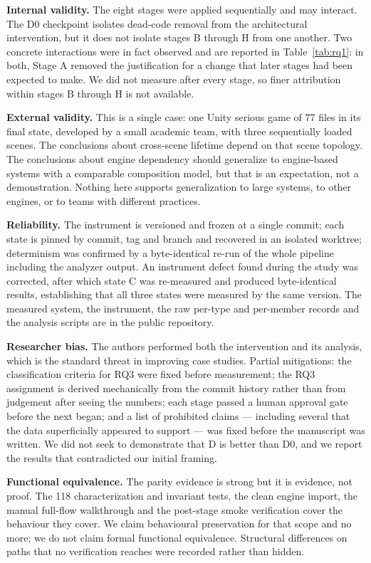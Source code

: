 \documentclass{sbc2019}%
\begin{document}
\medskip\noindent\textbf{Internal validity.} The eight stages were applied
sequentially and may interact. The D0 checkpoint isolates dead-code removal from
the architectural intervention, but it does not isolate stages B through H from
one another. Two concrete interactions were in fact observed and are reported in
Table~\ref{tab:rq1}: in both, Stage A removed the justification for a change
that later stages had been expected to make. We did not measure after every
stage, so finer attribution within stages B through H is not available.

\medskip\noindent\textbf{External validity.} This is a single case: one
Unity serious game of 77 files in its final state, developed by a small academic
team, with three sequentially loaded scenes. The conclusions about cross-scene
lifetime depend on that scene topology. The conclusions about engine dependency
should generalize to engine-based systems with a comparable composition model,
but that is an expectation, not a demonstration. Nothing here supports
generalization to large systems, to other engines, or to teams with different
practices.

\medskip\noindent\textbf{Reliability.} The instrument is versioned and frozen at
a single commit; each state is pinned by commit, tag and branch and recovered in
an isolated worktree; determinism was confirmed by a byte-identical re-run of the
whole pipeline including the analyzer output. An instrument defect found during
the study was corrected, after which state C was re-measured and produced
byte-identical results, establishing that all three states were measured by the
same version. The measured system, the instrument, the raw per-type and
per-member records and the analysis scripts are in the public repository.

\medskip\noindent\textbf{Researcher bias.} The authors performed both the
intervention and its analysis, which is the standard threat in improving case
studies. Partial mitigations: the classification criteria for RQ3 were fixed
before measurement; the RQ3 assignment is derived mechanically from the commit
history rather than from judgement after seeing the numbers; each stage passed a
human approval gate before the next began; and a list of prohibited claims ---
including several that the data superficially appeared to support --- was fixed
before the manuscript was written. We did not seek to demonstrate that D is
better than D0, and we report the results that contradicted our initial framing.

\medskip\noindent\textbf{Functional equivalence.} The parity evidence is strong
but it is evidence, not proof. The 118 characterization and invariant tests, the
clean engine import, the manual full-flow walkthrough and the post-stage smoke
verification cover the behaviour they cover. We claim behavioural preservation
for that scope and no more; we do not claim formal functional equivalence.
Structural differences on paths that no verification reaches were recorded rather
than hidden.
\end{document}

